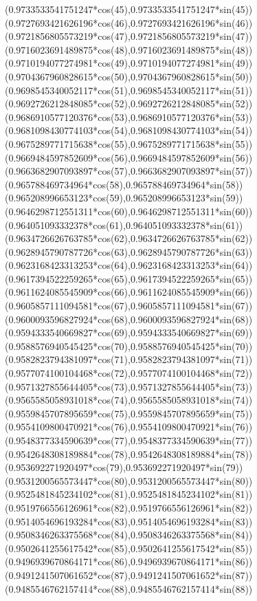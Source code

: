 {({0.9733533541751247*cos(45)},{0.9733533541751247*sin(45)})
({0.9727693421626196*cos(46)},{0.9727693421626196*sin(46)})
({0.9721856805573219*cos(47)},{0.9721856805573219*sin(47)})
({0.9716023691489875*cos(48)},{0.9716023691489875*sin(48)})
({0.9710194077274981*cos(49)},{0.9710194077274981*sin(49)})
({0.9704367960828615*cos(50)},{0.9704367960828615*sin(50)})
({0.9698545340052117*cos(51)},{0.9698545340052117*sin(51)})
({0.9692726212848085*cos(52)},{0.9692726212848085*sin(52)})
({0.9686910577120376*cos(53)},{0.9686910577120376*sin(53)})
({0.9681098430774103*cos(54)},{0.9681098430774103*sin(54)})
({0.9675289771715638*cos(55)},{0.9675289771715638*sin(55)})
({0.9669484597852609*cos(56)},{0.9669484597852609*sin(56)})
({0.9663682907093897*cos(57)},{0.9663682907093897*sin(57)})
({0.965788469734964*cos(58)},{0.965788469734964*sin(58)})
({0.965208996653123*cos(59)},{0.965208996653123*sin(59)})
({0.9646298712551311*cos(60)},{0.9646298712551311*sin(60)})
({0.964051093332378*cos(61)},{0.964051093332378*sin(61)})
({0.9634726626763785*cos(62)},{0.9634726626763785*sin(62)})
({0.9628945790787726*cos(63)},{0.9628945790787726*sin(63)})
({0.9623168423313253*cos(64)},{0.9623168423313253*sin(64)})
({0.9617394522259265*cos(65)},{0.9617394522259265*sin(65)})
({0.9611624085545909*cos(66)},{0.9611624085545909*sin(66)})
({0.9605857111094581*cos(67)},{0.9605857111094581*sin(67)})
({0.9600093596827924*cos(68)},{0.9600093596827924*sin(68)})
({0.9594333540669827*cos(69)},{0.9594333540669827*sin(69)})
({0.9588576940545425*cos(70)},{0.9588576940545425*sin(70)})
({0.9582823794381097*cos(71)},{0.9582823794381097*sin(71)})
({0.9577074100104468*cos(72)},{0.9577074100104468*sin(72)})
({0.9571327855644405*cos(73)},{0.9571327855644405*sin(73)})
({0.9565585058931018*cos(74)},{0.9565585058931018*sin(74)})
({0.9559845707895659*cos(75)},{0.9559845707895659*sin(75)})
({0.9554109800470921*cos(76)},{0.9554109800470921*sin(76)})
({0.9548377334590639*cos(77)},{0.9548377334590639*sin(77)})
({0.9542648308189884*cos(78)},{0.9542648308189884*sin(78)})
({0.953692271920497*cos(79)},{0.953692271920497*sin(79)})
({0.9531200565573447*cos(80)},{0.9531200565573447*sin(80)})
({0.9525481845234102*cos(81)},{0.9525481845234102*sin(81)})
({0.9519766556126961*cos(82)},{0.9519766556126961*sin(82)})
({0.9514054696193284*cos(83)},{0.9514054696193284*sin(83)})
({0.9508346263375568*cos(84)},{0.9508346263375568*sin(84)})
({0.9502641255617542*cos(85)},{0.9502641255617542*sin(85)})
({0.9496939670864171*cos(86)},{0.9496939670864171*sin(86)})
({0.9491241507061652*cos(87)},{0.9491241507061652*sin(87)})
({0.9485546762157414*cos(88)},{0.9485546762157414*sin(88)})
}
